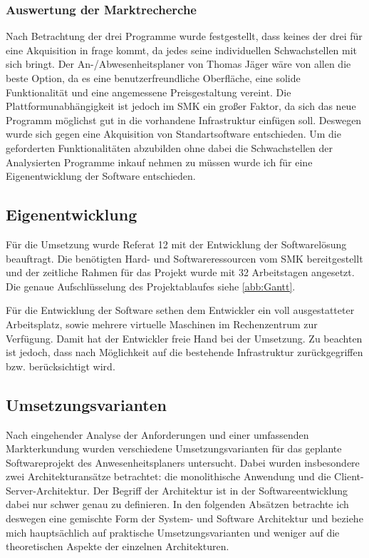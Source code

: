 \subsubsection{Auswertung der Marktrecherche}
\label{sec:AuswertungMarktrecherche}
Nach Betrachtung der drei Programme wurde festgestellt, dass keines der drei für eine Akquisition in frage kommt, da jedes seine individuellen Schwachstellen mit sich bringt. Der An-/Abwesenheitsplaner von Thomas Jäger wäre von allen die beste Option, da es eine benutzerfreundliche Oberfläche, eine solide Funktionalität und eine angemessene Preisgestaltung vereint. Die Plattformunabhängigkeit ist jedoch im SMK ein großer Faktor, da sich das neue Programm möglichst gut in die vorhandene Infrastruktur einfügen soll. Deswegen wurde sich gegen eine Akquisition von Standartsoftware entschieden. Um die geforderten Funktionalitäten abzubilden ohne dabei die Schwachstellen der Analysierten Programme inkauf nehmen zu müssen wurde ich für eine Eigenentwicklung der Software entschieden.

\subsection{Eigenentwicklung}
\label{sec:Eigenentwicklung}
Für die Umsetzung wurde Referat 12 mit der Entwicklung der Softwarelösung beauftragt. Die benötigten Hard- und Softwareressourcen vom SMK bereitgestellt und der zeitliche Rahmen für das Projekt wurde mit 32 Arbeitstagen angesetzt. Die genaue Aufschlüsselung des Projektablaufes siehe \ref{abb:Gantt}.

Für die Entwicklung der Software sethen dem Entwickler ein voll ausgestatteter Arbeitsplatz, sowie mehrere virtuelle Maschinen im Rechenzentrum zur Verfügung. Damit hat der Entwickler freie Hand bei der Umsetzung. Zu beachten ist jedoch, dass nach Möglichkeit auf die bestehende Infrastruktur zurückgegriffen bzw. berücksichtigt wird.


\subsection{Umsetzungsvarianten}
\label{sec:Umsetzungsvarianten}
Nach eingehender Analyse der Anforderungen und einer umfassenden Markterkundung wurden verschiedene Umsetzungsvarianten für das geplante Softwareprojekt des Anwesenheitsplaners untersucht. Dabei wurden insbesondere zwei Architekturansätze betrachtet: die monolithische Anwendung und die Client-Server-Architektur. Der Begriff der Architektur ist in der Softwareentwicklung dabei nur schwer genau zu definieren. In den folgenden Absätzen betrachte ich deswegen eine gemischte Form der System- und Software Architektur und beziehe mich hauptsächlich auf praktische Umsetzungsvarianten und weniger auf die theoretischen Aspekte der einzelnen Architekturen.

